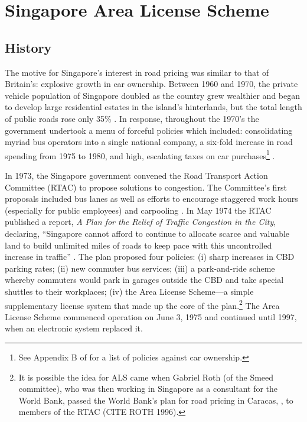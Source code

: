 \section{Singapore Area License Scheme}

\subsection{History}

The motive for Singapore's interest in road pricing was similar to that of Britain's: explosive growth in car ownership. Between 1960 and 1970, the private vehicle population of Singapore doubled as the country grew wealthier and began to develop large residential estates in the island's hinterlands, but the total length of public roads rose only 35\% \citep[p.211-212]{Santos2004}. In response, throughout the 1970's the government undertook a menu of forceful policies which included: consolidating myriad bus operators into a single national company, a six-fold increase in road spending from 1975 to 1980, and high, escalating taxes on car purchases\footnote{See Appendix B of \citet{Gomez-Ibanez1994} for a list of  policies against car ownership.} \citep{Santos2004}. 

In 1973, the Singapore government convened the Road Transport Action Committee (RTAC) to propose solutions to congestion. The Committee's first proposals included bus lanes as well as efforts to encourage staggered work hours (especially for public employees) and carpooling \citep{Chin1998}. In May 1974 the RTAC published a report, \emph{A Plan for the Relief of Traffic Congestion in the City}, declaring, ``Singapore cannot afford to continue to allocate scarce and valuable land to build unlimited miles of roads to keep pace with this uncontrolled increase in traffic'' \citep[p.3]{SRTAC1974}. The plan proposed four policies: (i) sharp increases in CBD parking rates; (ii) new commuter bus services; (iii) a park-and-ride scheme whereby commuters would park in garages outside the CBD and take special shuttles to their workplaces; (iv) the Area License Scheme---a simple supplementary license system that made up the core of the plan.\footnote{It is possible the idea for ALS came when Gabriel Roth (of the Smeed committee), who was then working in Singapore as a consultant for the World Bank, passed the World Bank's plan for road pricing in Caracas, \citet{Vorhees1973}, to members of the RTAC (CITE ROTH 1996).} The Area License Scheme commenced operation on June 3, 1975 and continued until 1997, when an electronic system replaced it.

